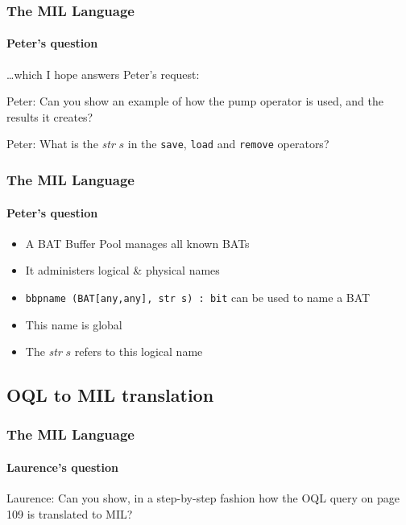 \documentclass{beamer}
\begin{document}
\begin{frame}
  \frametitle{The MIL Language}
  \framesubtitle{Peter's question}

  \ldots which I hope answers Peter's request:

  \begin{block}{Peter:}
  Can you show an example of how the pump operator is used, and the
  results it creates?
  \end{block}

  \pause

  \begin{block}{Peter:}
  What is the \textit{str} $s$ in the {\tt save}, {\tt load} and {\tt remove}
  operators?
  \end{block}

\end{frame}

\begin{frame}
  \frametitle{The MIL Language}
  \framesubtitle{Peter's question}

  \begin{itemize}
  \item A BAT Buffer Pool manages all known BATs
  \item It administers logical \& physical names
  \item {\tt bbpname (BAT[any,any], str s) : bit} can be used to name a BAT
  \item This name is global
  \item The \textit{str} $s$ refers to this logical name
  \end{itemize}


\end{frame}

\subsection{OQL to MIL translation}

\begin{frame}
  \frametitle{The MIL Language}
  \framesubtitle{Laurence's question}

  \begin{block}{Laurence:}
  Can you show, in a step-by-step fashion how the OQL query on page 109
  is translated to MIL?
  \end{block}

\end{frame}
\end{document}
